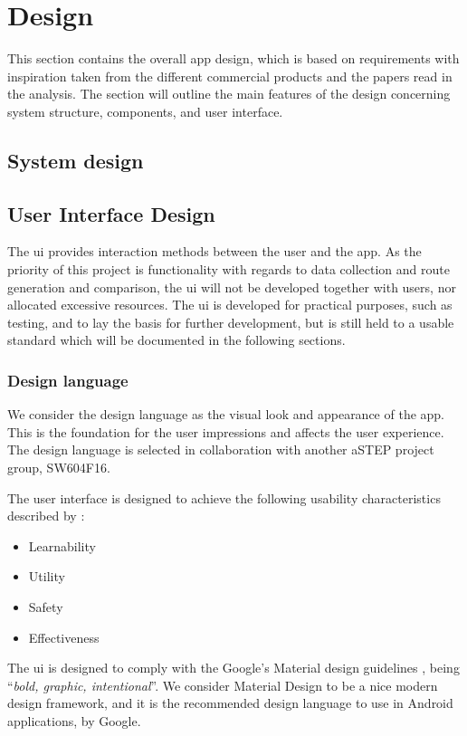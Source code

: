 \section{Design}\label{sprint1design}
This section contains the overall app design, which is based on requirements with inspiration taken from the different commercial products and the papers read in the analysis.
The section will outline the main features of the design concerning system structure, components, and user interface.

\subsection{System design}


\subsection{User Interface Design}
The \gls{ui} provides interaction methods between the user and the app.
As the priority of this project is functionality with regards to data collection and route generation and comparison, the \gls{ui} will not be developed together with users, nor allocated excessive resources. 
The \gls{ui} is developed for practical purposes, such as testing, and to lay the basis for further development, but is still held to a usable standard which will be documented in the following sections. 

\subsubsection{Design language}
We consider the design language as the visual look and appearance of the app.
This is the foundation for the user impressions and affects the user experience.
The design language is selected in collaboration with another aSTEP project group, SW604F16.

The user interface is designed to achieve the following usability characteristics described by \citet{DIS2014}:
\begin{itemize}
	\item Learnability
	\item Utility
	\item Safety
	\item Effectiveness
\end{itemize}

The \gls{ui} is designed to comply with the Google's Material design guidelines \cite{materialDesign}, being ``\textit{bold, graphic, intentional}''. 
We consider Material Design to be a nice modern design framework, and it is the recommended design language to use in Android applications, by Google\cite{materialProperties}. 

